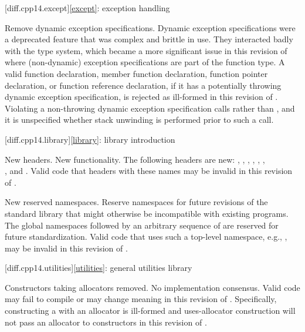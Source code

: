 [diff.cpp14.except]{\ref{except}: exception handling}

\change
Remove dynamic exception specifications.
\rationale
Dynamic exception specifications were a deprecated feature
that was complex and brittle in use.
They interacted badly with the type system,
which became a more significant issue in this revision of \Cpp{}
where (non-dynamic) exception specifications are part of the function type.
\effect
A valid \CppXIV{} function declaration,
member function declaration,
function pointer declaration,
or function reference declaration,
if it has a potentially throwing dynamic exception specification,
is rejected as ill-formed in this revision of \Cpp{}.
Violating a non-throwing dynamic exception specification
calls  rather than ,
and it is unspecified whether stack unwinding is performed
prior to such a call.

[diff.cpp14.library]{\ref{library}: library introduction}

\change
New headers.
\rationale
New functionality.
\effect
The following \Cpp{} headers are new:
,
,
,
,
,
,\\
,
and
.
Valid \CppXIV{} code that  headers with these names may be
invalid in this revision of \Cpp{}.

\change
New reserved namespaces.
\rationale
Reserve namespaces for future revisions of the standard library
that might otherwise be incompatible with existing programs.
\effect
The global namespaces 
followed by an arbitrary sequence of 
are reserved for future standardization.
Valid \CppXIV{} code that uses such a top-level namespace,
e.g., , may be invalid in this revision of \Cpp{}.

[diff.cpp14.utilities]{\ref{utilities}: general utilities library}

\change
Constructors taking allocators removed.
\rationale
No implementation consensus.
\effect
Valid \CppXIV{} code may fail to compile or may change meaning in this
revision of \Cpp{}. Specifically, constructing a  with
an allocator is ill-formed and uses-allocator construction will not pass an
allocator to  constructors in this revision of \Cpp{}.

